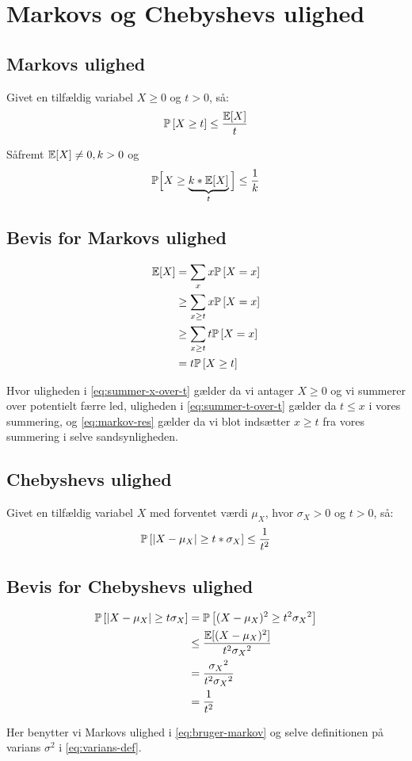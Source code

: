 \section{Markovs og Chebyshevs ulighed}
\subsection{Markovs ulighed}
Givet en tilfældig variabel $X \geq 0$ og $t > 0$, så:
\begin{align}
  \P{X \geq t} \leq \frac{\E[X]}{t} \label{eq:markov}
\end{align}

Såfremt $\E[X] \neq 0, k > 0$ og
$$
\mathbb{P} \Big[X \geq \underbrace{k * \E[X]}_{t} \Big] \leq \frac{1}{k}
$$

\subsection{Bevis for Markovs ulighed}
\begin{align}
  \E[X]
  &= \sum_x x \P{X = x} \nonumber \\
  &\geq \sum_{x \geq t} x \P{X = x} \label{eq:summer-x-over-t} \\
  &\geq \sum_{x \geq t} t \P{X = x} \label{eq:summer-t-over-t} \\
  &= t \P{X \geq t} \label{eq:markov-res}
\end{align}

Hvor uligheden i \cref{eq:summer-x-over-t} gælder da vi antager $X \geq 0$ og vi summerer over potentielt færre led, uligheden i \cref{eq:summer-t-over-t} gælder da $t \leq x$ i vores summering, og \cref{eq:markov-res} gælder da vi blot indsætter $x \geq t$ fra vores summering i selve sandsynligheden.

\subsection{Chebyshevs ulighed}
Givet en tilfældig variabel $X$ med forventet værdi $\mu_X$, hvor $\sigma_X > 0$ og $t > 0$, så:
\begin{align}
  \P{|X - \mu_X| \geq t * \sigma_X} \leq \frac{1}{t^2} \label{eq:chebyshev}
\end{align}

\subsection{Bevis for Chebyshevs ulighed}

\begin{align}
  \P{|X - \mu_X| \geq t \sigma_X}
  &= \P{(X - \mu_X)^2 \geq t^2 {\sigma_X}^2} \nonumber \\
  &\leq \frac{\E[(X - \mu_X)^2]}{t^2 {\sigma_X}^2} \label{eq:bruger-markov} \\
  &= \frac{{\sigma_X}^2}{t^2 {\sigma_X}^2} \label{eq:varians-def} \\
  &= \frac{1}{t^2} \nonumber
\end{align}

Her benytter vi Markovs ulighed i \cref{eq:bruger-markov} og selve definitionen på varians $\sigma^2$ i \cref{eq:varians-def}.
